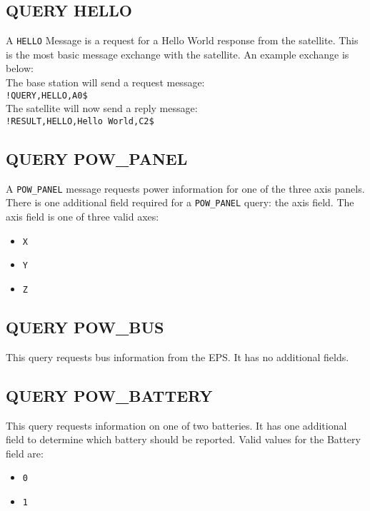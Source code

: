 \documentclass{article}
\begin{document}
  \subsection{QUERY HELLO}
    A \mquery \texttt{HELLO} Message is a \mquery request for a Hello World response from the satellite. This is the most basic
    message exchange with the satellite. An example exchange is below: \\[5pt]
    The base station will send a request \mquery message: \\[5pt]
    \texttt{!QUERY,HELLO,A0\$} \\[5pt]
    The satellite will now send a reply \mresult message: \\[5pt]
    \texttt{!RESULT,HELLO,Hello World,C2\$} \\[5pt]
    
    
  \subsection{QUERY POW\_PANEL}
    A \mquery \texttt{POW\_PANEL} message requests power information for one of the three axis panels. There is one additional
    field required for a \mquery \texttt{POW\_PANEL} query: the axis field. The axis field is one of three valid axes:
    \begin{itemize}
    \item \texttt{X}
    \item \texttt{Y}
    \item \texttt{Z}
    \end{itemize}
    
  \subsection{QUERY POW\_BUS}
    This query requests bus information from the EPS. It has no additional fields.
    
  \subsection{QUERY POW\_BATTERY}
    This query requests information on one of two batteries. It has one additional field to determine which battery should be reported.
    Valid values for the Battery field are: 
    \begin{itemize}
    \item \texttt{0}
    \item \texttt{1}
    \end{itemize}
  
\end{document}
